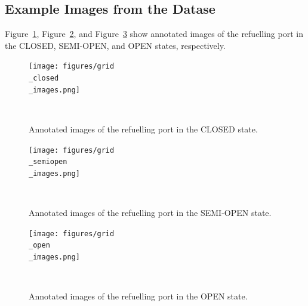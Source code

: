 \documentclass[12pt,oneside]{book} %
\begin{document}
\subsection{Example Images from the Datase}
\noindent Figure~\ref{fig:grid-closed-images}, Figure~\ref{fig:grid-semi-open-images}, and
Figure~\ref{fig:grid-open-images} show annotated images of the refuelling port
in the CLOSED, SEMI-OPEN, and OPEN states, respectively.
\begin{figure}[H]
    \centering
    \texttt{[image: figures/grid\\\_closed\\\_images.png]}
    \caption{Annotated images of the refuelling port in the CLOSED state.}~\label{fig:grid-closed-images}
\end{figure}

\begin{figure}[H]
    \centering
    \texttt{[image: figures/grid\\\_semiopen\\\_images.png]}
    \caption{Annotated images of the refuelling port in the SEMI-OPEN state.}~\label{fig:grid-semi-open-images}
\end{figure}

\begin{figure}[H]
    \centering
    \texttt{[image: figures/grid\\\_open\\\_images.png]}
    \caption{Annotated images of the refuelling port in the OPEN state.}~\label{fig:grid-open-images}
\end{figure}
\end{document}
